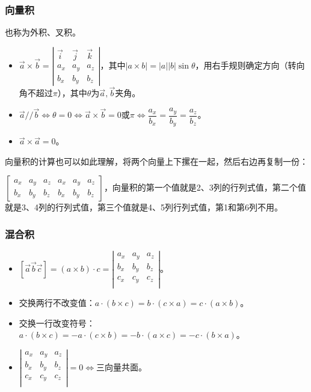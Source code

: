 \subsubsection{向量积}

也称为外积、叉积。

\begin{itemize}
    \item $\vec{a}\times\vec{b}=\left\vert\begin{array}{ccc}
        \vec{i} & \vec{j} & \vec{k} \\
        a_x & a_y & a_z \\
        b_x & b_y & b_z
    \end{array}\right\vert$，其中$\vert a\times b\vert=\vert a\vert\vert b\vert\sin\theta$，用右手规则确定方向（转向角不超过$\pi$），其中$\theta$为$\vec{a},\vec{b}$夹角。
    \item $\vec{a}//\vec{b}\Leftrightarrow\theta=0\Leftrightarrow\vec{a}\times\vec{b}=0$或$\pi\Leftrightarrow\dfrac{a_x}{b_x}=\dfrac{a_y}{b_y}=\dfrac{a_z}{b_z}$。
    \item $\vec{a}\times\vec{a}=0$。
\end{itemize}

向量积的计算也可以如此理解，将两个向量上下摞在一起，然后右边再复制一份：

$\left[\begin{array}{cccccc}
    a_x & a_y & a_z & a_x & a_y & a_z \\
    b_x & b_y & b_z & b_x & b_y & b_z
\end{array}\right]$，向量积的第一个值就是2、3列的行列式值，第二个值就是3、4列的行列式值，第三个值就是4、5列行列式值，第1和第6列不用。

\subsubsection{混合积}

\begin{itemize}
    \item $[\vec{a}\vec{b}\vec{c}]=(a\times b)\cdot c=\left\vert\begin{array}{ccc}
        a_x & a_y & a_z \\
        b_x & b_y & b_z \\
        c_x & c_y & c_z \\
    \end{array}\right\vert$。
    \item 交换两行不改变值：$a\cdot(b\times c)=b\cdot(c\times a)=c\cdot(a\times b)$。
    \item 交换一行改变符号：$a\cdot(b\times c)=-a\cdot(c\times b)=-b\cdot(a\times c)=-c\cdot(b\times a)$。
    \item $\left\vert\begin{array}{ccc}
        a_x & a_y & a_z \\
        b_x & b_y & b_z \\
        c_x & c_y & c_z \\
    \end{array}\right\vert=0\Leftrightarrow$三向量共面。
\end{itemize}

